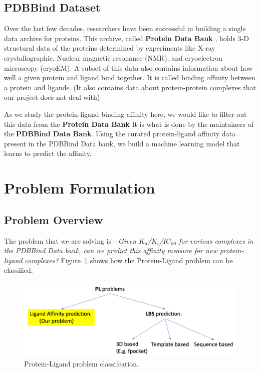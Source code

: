 \documentclass[11pt]{article}
\begin{document}
\subsection{PDBBind Dataset}
Over the last few decades, researchers have been successful in building a single data archive for proteins.  This archive, called \textbf{Protein Data Bank} \cite{pdb_homepage} , holds 3-D structural data of the proteins determined by experiments like X-ray crystallographic, Nuclear magnetic resonance (NMR), and cryoelectron microscopy (cryoEM).  A subset of this data also contains information about how well a given protein and ligand bind together.  It is called binding affinity between a protein and ligands.  (It also contains data about protein-protein complexes that our project does not deal with)
\cite{pdbank_history}

As we study the protein-ligand binding affinity here, we would like to filter out this data from the \textbf{Protein Data Bank}  It is what is done by the maintainers of the \textbf{PDBBind Data Bank}.
\cite{pdbbind_introduction}
Using the curated protein-ligand affinity data present in the PDBBind Data bank, we build a machine learning model that learns to predict the affinity. 

\section{Problem Formulation}
\subsection{Problem Overview}
\label{ProblemOverviewlabel}
The problem that we are solving is - \textit{Given $K_d$/$K_i$/$IC_{50}$ for various complexes in the PDBBind Data bank,
can we predict this affinity measure for new protein-ligand complexes?}
Figure~\ref{fig:plproblemclassification} shows how the Protein-Ligand problem can be classified.

\begin{figure}[htb]
  \centering
    \includegraphics[scale=0.35]{images/pl_problem_classification}
    \caption{Protein-Ligand problem classifcation.}
    \label{fig:plproblemclassification}
\end{figure}
\end{document}
